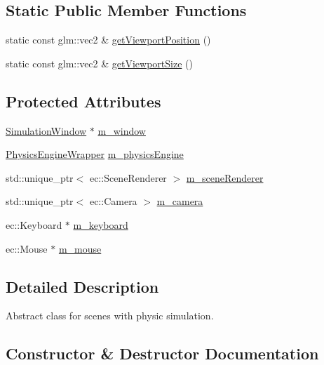 \subsection*{Static Public Member Functions}
\begin{DoxyCompactItemize}
\item 
static const glm\+::vec2 \& \mbox{\hyperlink{class_simulation_scene_a612b677ff28dbc9f7f6f609432ecf922}{get\+Viewport\+Position}} ()
\item 
static const glm\+::vec2 \& \mbox{\hyperlink{class_simulation_scene_a1601590e4029a75f73e46ae2bf8f24f6}{get\+Viewport\+Size}} ()
\end{DoxyCompactItemize}
\subsection*{Protected Attributes}
\begin{DoxyCompactItemize}
\item 
\mbox{\hyperlink{class_simulation_window}{Simulation\+Window}} $\ast$ \mbox{\hyperlink{class_simulation_scene_a704310f4a3436f746afcc197b0893302}{m\+\_\+window}}
\item 
\mbox{\hyperlink{class_physics_engine_wrapper}{Physics\+Engine\+Wrapper}} \mbox{\hyperlink{class_simulation_scene_aec843c805c0cad71393fe7cb18fb5c62}{m\+\_\+physics\+Engine}}
\item 
std\+::unique\+\_\+ptr$<$ ec\+::\+Scene\+Renderer $>$ \mbox{\hyperlink{class_simulation_scene_a97b314741c8056ae2168f8084926003a}{m\+\_\+scene\+Renderer}}
\item 
std\+::unique\+\_\+ptr$<$ ec\+::\+Camera $>$ \mbox{\hyperlink{class_simulation_scene_af3eac48c03330d03c304d33b21dd4d33}{m\+\_\+camera}}
\item 
ec\+::\+Keyboard $\ast$ \mbox{\hyperlink{class_simulation_scene_a8c6d930754996e9860d7ea3d63529a93}{m\+\_\+keyboard}}
\item 
ec\+::\+Mouse $\ast$ \mbox{\hyperlink{class_simulation_scene_aa48e90426a32da44796da2016a4ed10a}{m\+\_\+mouse}}
\end{DoxyCompactItemize}


\subsection{Detailed Description}
Abstract class for scenes with physic simulation. 

\subsection{Constructor \& Destructor Documentation}
\mbox{\label{class_simulation_scene_a6adc5bb46c9989e666076edcb4e8e2de}} 
